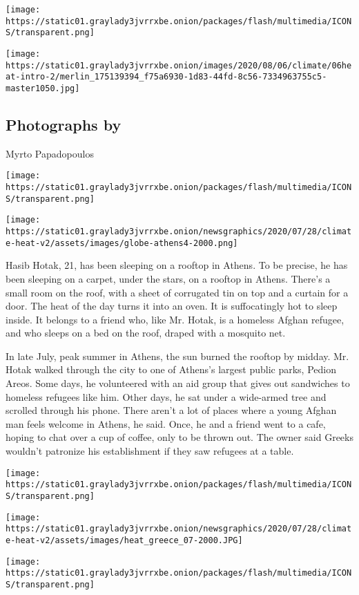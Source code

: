 \texttt{[image: https://static01.graylady3jvrrxbe.onion/packages/flash/multimedia/ICONS/transparent.png]}

\texttt{[image: https://static01.graylady3jvrrxbe.onion/images/2020/08/06/climate/06heat-intro-2/merlin\_175139394\_f75a6930-1d83-44fd-8c56-7334963755c5-master1050.jpg]}

\hypertarget{photographs-by}{%
\subsection{Photographs by}\label{photographs-by}}

Myrto Papadopoulos

\texttt{[image: https://static01.graylady3jvrrxbe.onion/packages/flash/multimedia/ICONS/transparent.png]}

\texttt{[image: https://static01.graylady3jvrrxbe.onion/newsgraphics/2020/07/28/climate-heat-v2/assets/images/globe-athens4-2000.png]}

Hasib Hotak, 21, has been sleeping on a rooftop in Athens. To be
precise, he has been sleeping on a carpet, under the stars, on a rooftop
in Athens. There's a small room on the roof, with a sheet of corrugated
tin on top and a curtain for a door. The heat of the day turns it into
an oven. It is suffocatingly hot to sleep inside. It belongs to a friend
who, like Mr. Hotak, is a homeless Afghan refugee, and who sleeps on a
bed on the roof, draped with a mosquito net.

In late July, peak summer in Athens, the sun burned the rooftop by
midday. Mr. Hotak walked through the city to one of Athens's largest
public parks, Pedion Areos. Some days, he volunteered with an aid group
that gives out sandwiches to homeless refugees like him. Other days, he
sat under a wide-armed tree and scrolled through his phone. There aren't
a lot of places where a young Afghan man feels welcome in Athens, he
said. Once, he and a friend went to a cafe, hoping to chat over a cup of
coffee, only to be thrown out. The owner said Greeks wouldn't patronize
his establishment if they saw refugees at a table.

\texttt{[image: https://static01.graylady3jvrrxbe.onion/packages/flash/multimedia/ICONS/transparent.png]}

\texttt{[image: https://static01.graylady3jvrrxbe.onion/newsgraphics/2020/07/28/climate-heat-v2/assets/images/heat\_greece\_07-2000.JPG]}

\texttt{[image: https://static01.graylady3jvrrxbe.onion/packages/flash/multimedia/ICONS/transparent.png]}

